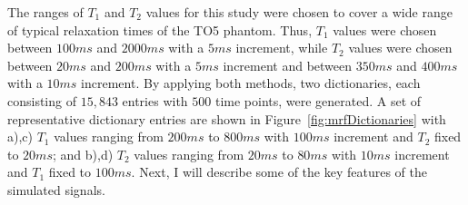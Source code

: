 The ranges of $T_1$ and $T_2$ values for this study were chosen to cover a wide range of typical relaxation times of the TO5 phantom.
Thus, $T_1$ values were chosen between $100ms$ and $2000ms$ with a $5ms$ increment, while
$T_2$ values were chosen between $20ms$ and $200ms$ with a $5ms$ increment and between $350ms$ and $400ms$ with a $10ms$ increment.
By applying both methods, two dictionaries, each consisting of $15,843$ entries with $500$ time points, were generated.
A set of representative dictionary entries are shown in Figure~\ref{fig:mrfDictionaries} with a),c) $T_1$ values ranging from $200ms$ to $800ms$ with $100ms$ increment and $T_2$ fixed to $20ms$; and b),d) $T_2$ values ranging from $20ms$ to $80ms$ with $10ms$ increment and $T_1$ fixed to $100ms$.
Next, I will describe some of the key features of the simulated signals.

